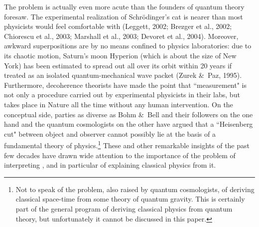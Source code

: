 \documentclass[12pt,titlepage]{article}
\begin{document}
The problem is actually even more acute than the founders of quantum theory foresaw. 
The experimental realization of  Schr\"{o}dinger's cat  is nearer than most physicists would feel comfortable with (Leggett, 2002;  Brezger et al., 2002; Chiorescu et al., 2003; 
Marshall et al., 2003;  Devoret et al., 2004). 
Moreover, awkward superpositions are by no means confined to physics 
 laboratories:  due to its chaotic motion, Saturn's moon Hyperion (which is about the size of New York) has been estimated to spread out all over its orbit within  20 years if treated as an isolated  quantum-mechanical wave packet (Zurek \&\ Paz, 1995). Furthermore, decoherence theorists have made the point  that ``measurement" is not only a procedure carried out by experimental physicists in their labs, but takes place in Nature all the time without any human intervention. On the conceptual side, parties as diverse as  Bohm \&\ Bell and their followers on the one hand  and the quantum cosmologists on the other have argued
that a ``Heisenberg cut" between object and observer cannot possibly lie at the basis of
a fundamental theory of physics.\footnote{Not to speak of the problem, also raised
by quantum cosmologists, of deriving classical space-time from some theory of quantum gravity. This is certainly part of the general program of deriving classical physics from quantum theory, but unfortunately it cannot be discussed in this paper. }
  These and other remarkable  insights of the past few decades have drawn wide attention to the importance of the problem of interpreting \qm, and in particular of explaining classical physics from it. 
\end{document}
